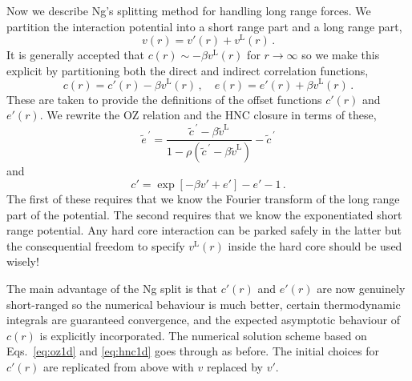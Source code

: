 \documentclass[12pt,a4paper]{article}
\newcommand{\lr}{^{\mathrm{L}}}
\newcommand{\tildevlr}{{\tilde v}\lr}
\newcommand{\myprime}{^{{}\,\prime}}
\newcommand{\Eqsref}[1]{Eqs.~\eqref{#1}}
\begin{document}
Now we describe Ng's splitting method for handling long range forces.
We partition the interaction potential into a short range part and a
long range part,
%
\begin{equation}
v(r)=v'(r)+v\lr(r)\,.
\end{equation}
%
It is generally accepted that $c(r)\sim-\beta v\lr(r)$ for
$r\to\infty$ so we make this explicit by partitioning both the direct
and indirect correlation functions,
%
\begin{equation}
c(r)=c'(r)-\beta v\lr(r)\,,\quad
e(r)=e'(r)+\beta v\lr(r)\,.
\end{equation}
%
These are taken to provide the definitions of the offset functions
$c'(r)$ and $e'(r)$.  We rewrite the OZ relation and the HNC closure
in terms of these,
%
\begin{equation}
\tilde e\myprime=\frac{\tilde c\myprime-\beta\tildevlr}{1-\rho(\tilde
  c\myprime-\beta\tildevlr)}-\tilde c\myprime
\label{eq:oz1d}
\end{equation}
and
\begin{equation}
c'=\exp[-\beta v'+e']-e'-1\,.
\label{eq:hnc1d}
\end{equation}
%
The first of these requires that we know the Fourier transform of the
long range part of the potential.  The second requires that we know
the exponentiated short range potential.  Any hard core interaction
can be parked safely in the latter but the consequential freedom to
specify $v\lr(r)$ inside the hard core should be used wisely!

The main advantage of the Ng split is that $c'(r)$ and $e'(r)$ are now
genuinely short-ranged so the numerical behaviour is much better,
certain thermodynamic integrals are guaranteed convergence, and the
expected asymptotic behaviour of $c(r)$ is explicitly incorporated.
The numerical solution scheme based on \Eqsref{eq:oz1d} and
\eqref{eq:hnc1d} goes through as before.  The initial choices for
$c'(r)$ are replicated from above with $v$ replaced by $v'$.
\end{document}
